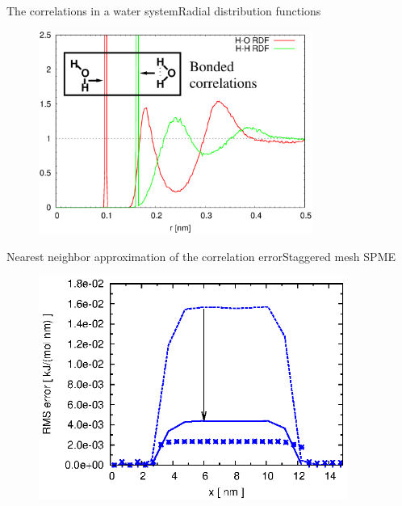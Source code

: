 \documentclass{beamer}
\begin{document}
\begin{frame}{The correlations in a water system}{Radial distribution functions}
  \begin{figure}
    \centering
    \includegraphics[width=0.8\textwidth]{figs/long-range-nna/rdf-corr-h2o-1.eps}
  \end{figure}
\end{frame}


\begin{frame}{Nearest neighbor approximation of the correlation error}{Staggered mesh SPME}
  \begin{figure}
    \centering
    \includegraphics[width=0.9\textwidth]{figs/long-range-inhomo/water-st-error-2.eps}
  \end{figure}  
\end{frame}
\end{document}
